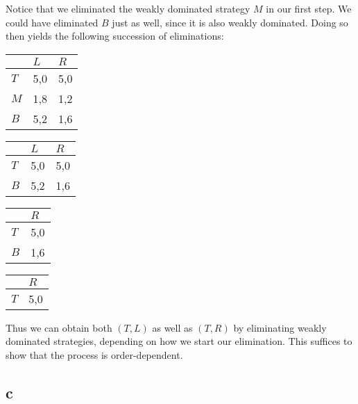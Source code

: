 \documentclass[10pt,a4paper]{article}
\begin{document}
Notice that we eliminated the weakly dominated strategy $M$ in our first step. We could have eliminated $B$ just as well, since it is also weakly dominated. Doing so then yields the following succession of eliminations:

\begin{table}[h]
\begin{tabular}{|l|l|l|}
\hline
          & $L$ & $R$  \\ \hline
$T$     & 5,0   & 5,0 \\ \hline
$M$     & 1,8 & 1,2  \\ \hline
$B$		& 5,2	& 1,6 \\ \hline
\end{tabular}
\end{table}

\begin{table}[h]
\begin{tabular}{|l|l|l|}
\hline
          & $L$ & $R$  \\ \hline
$T$     & 5,0   & 5,0 \\ \hline
$B$     & 5,2 & 1,6  \\ \hline
\end{tabular}
\end{table}

\begin{table}[h]
\begin{tabular}{|l|l|}
\hline
          & $R$\\ \hline
$T$     & 5,0 \\ \hline
$B$     & 1,6\\ \hline
\end{tabular}
\end{table}

\begin{table}[h]
\begin{tabular}{|l|l|}
\hline
          & $R$\\ \hline
$T$     & 5,0 \\ \hline
\end{tabular}
\end{table} 

Thus we can obtain both $(T,L)$ as well as $(T,R)$ by eliminating weakly dominated strategies, depending on how we start our elimination. This suffices to show that the process is order-dependent.

\subsection*{c}
\end{document}
